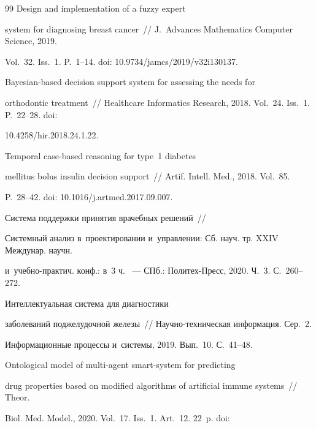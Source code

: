 {{\begin{thebibliography}{99}
 Design and implementation of a fuzzy expert 

system for diagnosing breast cancer~/\!\!/ J.~Advances Mathematics Computer Science, 2019. 

Vol.~32. Iss.~1. P.~1--14. doi: 10.9734\!/\!jamcs/2019/v32i130137.








 Bayesian-based decision support system for assessing the needs for 

orthodontic treatment~/\!\!/ Healthcare Informatics Research, 2018. Vol.~24. Iss.~1. P.~22--28. doi: 

10.4258\!/\!hir.2018.24.1.22.


 Temporal case-based reasoning for type~1 diabetes 

mellitus bolus insulin decision support~/\!\!/ Artif. Intell. Med., 2018. Vol.~85. 

P.~28--42. doi: 10.1016\!/\!j.artmed.2017.09.007.


 Система поддержки принятия врачебных решений~/\!\!/ 

Сис\-тем\-ный анализ в~проектировании и~управлении: Сб. науч. тр. XXIV Междунар. научн. 

и~учебно-практич. конф.: в~3 ч. ~--- СПб.: Политех-Пресс, 2020. Ч.~3. С.~260--272.


 Интеллектуальная система для диагностики 

заболеваний поджелудочной железы~/\!\!/ На\-уч\-но-тех\-ни\-че\-ская информация. Сер.~2. 

Информационные процессы и~сис\-те\-мы, 2019. Вып.~10. С.~41--48.


 Ontological model of multi-agent smart-system for predicting 

drug properties based on modified algorithms of artificial immune systems~/\!\!/ Theor. 

Biol. Med. Model., 2020. Vol.~17. Iss.~1. Art.~12. 22~p.  doi:  


\end{thebibliography}}}

